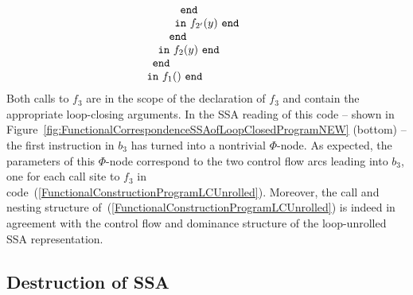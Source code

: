 \begin{equation}
\begin{array}{l}
\begin{array}{l}
\begin{array}[t]{l}
\begin{array}{l}
\begin{array}[t]{l}
\begin{array}[t]{l}
\begin{array}[t]{l}
                              \mathtt{end}
                            \end{array}\\
                      \mathtt{in}\ {f_{2'}}\mathtt{(}{y}\mathtt{)}\ \mathtt{end}
                  \end{array}\\
                  \mathtt{end}
               \end{array}
            \end{array}\\
       \mathtt{in}\ {f_2}\mathtt{(}{y}\mathtt{)}\ \mathtt{end}
     \end{array}\\
     \mathtt{end}
  \end{array}\\
  \mathtt{in}\ {f_1}\mathtt{(}{}\mathtt{)}\ \mathtt{end}
\end{array}
\end{equation}
Both calls to $f_3$ are in the scope of the declaration of $f_3$ and
contain the appropriate loop-closing arguments. In the SSA reading of
this code -- shown in
Figure~\ref{fig:FunctionalCorrespondenceSSAofLoopClosedProgramNEW}
(bottom) -- the first instruction in $b_3$ has turned into a
nontrivial $\Phi$-node. As expected, the parameters of this
$\Phi$-node correspond to the two control flow arcs leading into
$b_3$, one for each call site to $f_3$ in
code~(\ref{FunctionalConstructionProgramLCUnrolled}). Moreover, the
call and nesting structure
of~(\ref{FunctionalConstructionProgramLCUnrolled}) is indeed in
agreement with the control flow and dominance structure of the
loop-unrolled SSA representation.

%

\subsection{Destruction of SSA}
\label{section:Part1:Semantics:SSADestruction}

